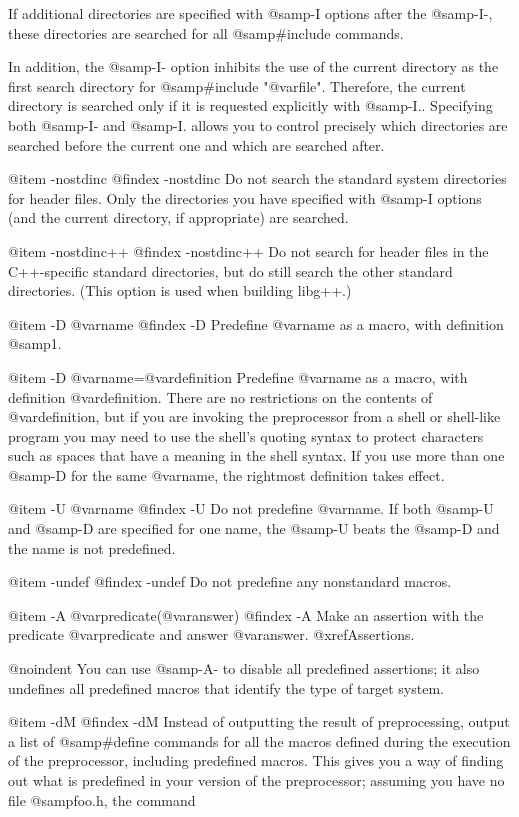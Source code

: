 {{{{If additional directories are specified with @samp{-I} options after
the @samp{-I-}, these directories are searched for all @samp{#include}
commands.

In addition, the @samp{-I-} option inhibits the use of the current
directory as the first search directory for @samp{#include "@var{file}"}.
Therefore, the current directory is searched only if it is requested
explicitly with @samp{-I.}.  Specifying both @samp{-I-} and @samp{-I.}
allows you to control precisely which directories are searched before
the current one and which are searched after.

@item -nostdinc
@findex -nostdinc
Do not search the standard system directories for header files.
Only the directories you have specified with @samp{-I} options
(and the current directory, if appropriate) are searched.

@item -nostdinc++
@findex -nostdinc++
Do not search for header files in the C++-specific standard directories,
but do still search the other standard directories.
(This option is used when building libg++.)

@item -D @var{name}
@findex -D
Predefine @var{name} as a macro, with definition @samp{1}.

@item -D @var{name}=@var{definition}
Predefine @var{name} as a macro, with definition @var{definition}.
There are no restrictions on the contents of @var{definition}, but if
you are invoking the preprocessor from a shell or shell-like program you
may need to use the shell's quoting syntax to protect characters such as
spaces that have a meaning in the shell syntax.  If you use more than
one @samp{-D} for the same @var{name}, the rightmost definition takes
effect.

@item -U @var{name}
@findex -U
Do not predefine @var{name}.  If both @samp{-U} and @samp{-D} are
specified for one name, the @samp{-U} beats the @samp{-D} and the name
is not predefined.

@item -undef
@findex -undef
Do not predefine any nonstandard macros.

@item -A @var{predicate}(@var{answer})
@findex -A
Make an assertion with the predicate @var{predicate} and answer
@var{answer}.  @xref{Assertions}.

@noindent
You can use @samp{-A-} to disable all predefined assertions; it also
undefines all predefined macros that identify the type of target system.

@item -dM
@findex -dM
Instead of outputting the result of preprocessing, output a list of
@samp{#define} commands for all the macros defined during the
execution of the preprocessor, including predefined macros.  This gives
you a way of finding out what is predefined in your version of the
preprocessor; assuming you have no file @samp{foo.h}, the command

}}}}
